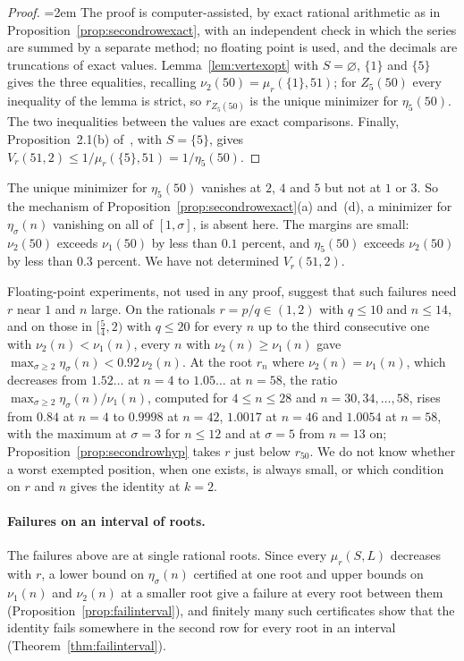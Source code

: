 \documentclass[11pt]{article}
\begin{document}
\begin{proof}
\emergencystretch=2em
The proof is computer-assisted, by exact rational arithmetic as in
Proposition~\ref{prop:secondrowexact}, with an independent check in which
the series are summed by a separate method;
no floating point is used, and the decimals
are truncations of exact values.  Lemma~\ref{lem:vertexopt} with
$S=\varnothing$, $\{1\}$ and $\{5\}$ gives the three equalities, recalling
$\nu_2(50)=\mu_r(\{1\},51)$; for $Z_5(50)$ every inequality of the lemma is
strict, so $r_{Z_5(50)}$ is the unique minimizer for $\eta_5(50)$.  The two
inequalities between the values are exact comparisons.  Finally,
Proposition~2.1(b) of~\cite{coefficient-mass-rows}, with $S=\{5\}$, gives
$V_r(51,2)\le1/\mu_r(\{5\},51)=1/\eta_5(50)$.
\end{proof}

The unique minimizer for $\eta_5(50)$ vanishes at $2$, $4$ and $5$ but not
at $1$ or $3$.  So the mechanism of Proposition~\ref{prop:secondrowexact}(a)
and~(d), a minimizer for $\eta_\sigma(n)$ vanishing on all of $[1,\sigma]$,
is absent here.  The margins are small: $\nu_2(50)$ exceeds $\nu_1(50)$ by less
than $0.1$ percent, and $\eta_5(50)$ exceeds $\nu_2(50)$ by less than
$0.3$ percent.  We have not determined $V_r(51,2)$.

Floating-point experiments, not used in any proof, suggest that such
failures need $r$ near $1$ and $n$ large.  On the rationals
$r=p/q\in(1,2)$ with $q\le10$ and $n\le14$, and on those in $[\frac54,2)$
with $q\le20$ for every $n$ up to the third consecutive one with
$\nu_2(n)<\nu_1(n)$, every $n$ with $\nu_2(n)\ge\nu_1(n)$ gave
$\max_{\sigma\ge2}\eta_\sigma(n)<0.92\,\nu_2(n)$.  At the root $r_n$ where
$\nu_2(n)=\nu_1(n)$, which decreases from $1.52\ldots$ at $n=4$ to
$1.05\ldots$ at $n=58$, the ratio $\max_{\sigma\ge2}\eta_\sigma(n)/\nu_1(n)$,
computed for $4\le n\le28$ and $n=30,34,\ldots,58$, rises from $0.84$ at
$n=4$ to $0.9998$ at $n=42$, $1.0017$ at $n=46$ and $1.0054$ at $n=58$,
with the maximum at $\sigma=3$ for $n\le12$ and at $\sigma=5$ from $n=13$
on; Proposition~\ref{prop:secondrowhyp} takes $r$ just below $r_{50}$.
We do not know whether a worst exempted position, when one exists, is
always small, or which condition on $r$ and $n$ gives the identity at
$k=2$.

\paragraph{Failures on an interval of roots.}
The failures above are at single rational roots.  Since every $\mu_r(S,L)$
decreases with $r$, a lower bound on $\eta_\sigma(n)$ certified at one root
and upper bounds on $\nu_1(n)$ and $\nu_2(n)$ at a smaller root give a
failure at every root between them (Proposition~\ref{prop:failinterval}), and finitely many such
certificates show that the identity fails somewhere in the second row for
every root in an interval (Theorem~\ref{thm:failinterval}).
\end{document}
